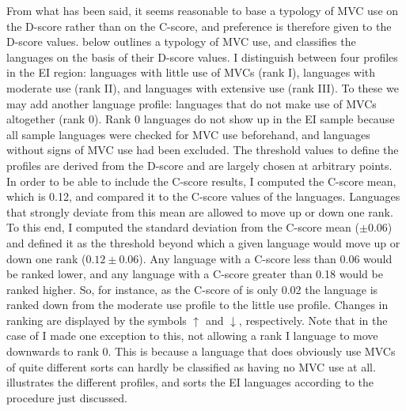 From what has been said, it seems reasonable to base a typology of MVC use on the D-score rather than on the C-score, and preference is therefore given to the D-score values.  below outlines a typology of MVC use, and classifies the languages on the basis of their D-score values. I distinguish between four profiles in the EI region: languages with little use of MVCs (rank I), languages with moderate use (rank II), and languages with extensive use (rank III). To these we may add another language profile: languages that do not make use of MVCs altogether (rank 0). Rank 0 languages do not show up in the EI sample because all sample languages were checked for MVC use beforehand, and languages without signs of MVC use had been excluded. The threshold values to define the profiles are derived from the D-score and are largely chosen at arbitrary points. In order to be able to include the C-score results, I computed the C-score mean, which is 0.12, and compared it to the C-score values of the languages. Languages that strongly deviate from this mean are allowed to move up or down one rank. To this end, I computed the standard deviation from the C-score mean ($\pm 0.06$) and defined it as the threshold beyond which a given language would move up or down one rank ($0.12 \pm 0.06$). Any language with a C-score less than 0.06 would be ranked lower, and any language with a C-score greater than 0.18 would be ranked higher. So, for instance, as the C-score of  is only 0.02 the language is ranked down from the moderate use profile to the little use profile. Changes in ranking are displayed by the symbols $\uparrow$ and $\downarrow$, respectively. Note that in the case of  I made one exception to this, not allowing a rank I language to move downwards to rank 0. This is because a language that does obviously use MVCs of quite different sorts can hardly be classified as having no MVC use at all.  illustrates the different profiles, and sorts the EI languages according to the procedure just discussed.

